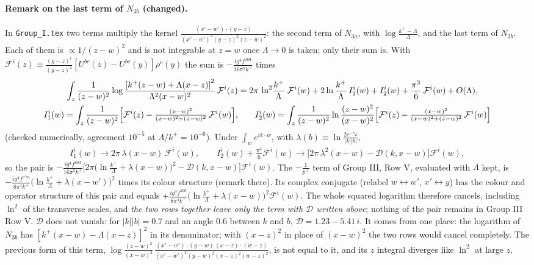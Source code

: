 \documentclass[9pt]{article}
\numberwithin{equation}{section}
\begin{document}
{\color{red}
\paragraph{Remark on the last term of $N_{3b}$ (changed).}
In \texttt{Group\_I.tex} two terms multiply the kernel $\frac{(x'-w')\cdot(y-z)}{(x'-w')^{2}(y-z)^{2}(z-w)^{2}}$: the second term of $N_{3a}$, with $\log\frac{k^{+}-\Lambda}{\Lambda}$, and the last term of $N_{3b}$. Each of them is $\propto 1/(z-w)^{2}$ and is not integrable at $z=w$ once $\Lambda\to0$ is taken; only their sum is. With $\mathcal{F}^{i}(z)\equiv\frac{(y-z)^{i}}{(y-z)^{2}}\left[U^{bc}(z)-U^{bc}(y)\right]\rho^{c}(y)$ the sum is $-\frac{ig^{4}f^{abd}}{16\pi^{5}k^{+}}$ times
\begin{align}
\int_{z}\frac{1}{(z-w)^{2}}\log\frac{\left[k^{+}(z-w)+\Lambda(x-z)\right]^{2}}{\Lambda^{2}(x-w)^{2}}\,\mathcal{F}^{i}(z)
&=2\pi\,\ln^{2}\!\frac{k^{+}}{\Lambda}\;\mathcal{F}^{i}(w)
+2\ln\frac{k^{+}}{\Lambda}\,I_{1}^{i}(w)+I_{2}^{i}(w)+\frac{\pi^{3}}{6}\,\mathcal{F}^{i}(w)+O(\Lambda),\\
I_{1}^{i}(w)=\int_{z}\frac{1}{(z-w)^{2}}\Big[\mathcal{F}^{i}(z)-\tfrac{(x-w)^{2}}{(x-w)^{2}+(z-w)^{2}}\,\mathcal{F}^{i}(w)\Big],&\qquad
I_{2}^{i}(w)=\int_{z}\frac{1}{(z-w)^{2}}\ln\frac{(z-w)^{2}}{(x-w)^{2}}\Big[\mathcal{F}^{i}(z)-\tfrac{(x-w)^{2}}{(x-w)^{2}+(z-w)^{2}}\,\mathcal{F}^{i}(w)\Big]\notag
\end{align}
(checked numerically, agreement $10^{-5}$ at $\Lambda/k^{+}=10^{-6}$). Under $\int_{w}e^{ik\cdot w}$, with $\lambda(b)\equiv\ln\frac{2e^{-\gamma_{E}}}{|k||b|}$,
\begin{align}
I_{1}^{i}(w)\to2\pi\,\lambda(x-w)\,\mathcal{F}^{i}(w),\qquad
I_{2}^{i}(w)+\frac{\pi^{3}}{6}\mathcal{F}^{i}(w)\to\Big[2\pi\,\lambda^{2}(x-w)-\mathcal{D}(k,x-w)\Big]\mathcal{F}^{i}(w),
\end{align}
so the pair is $-\frac{ig^{4}f^{abd}}{16\pi^{5}k^{+}}\Big[2\pi\big(\ln\frac{k^{+}}{\Lambda}+\lambda(x-w)\big)^{2}-\mathcal{D}(k,x-w)\Big]\mathcal{F}^{i}(w)$. The $-\frac{1}{p^{+}}$ term of Group III, Row V, evaluated with $\Lambda$ kept, is $-\frac{ig^{4}f^{c'ca}}{8\pi^{4}k^{+}}\big(\ln\frac{k^{+}}{\Lambda}+\lambda(x-w')\big)^{2}$ times its colour structure (remark there). Its complex conjugate (relabel $w\leftrightarrow w'$, $x'\leftrightarrow y$) has the colour and operator structure of this pair and equals $+\frac{ig^{4}f^{abd}}{8\pi^{4}k^{+}}\big(\ln\frac{k^{+}}{\Lambda}+\lambda(x-w)\big)^{2}\mathcal{F}^{i}(w)$. The whole squared logarithm therefore cancels, including $\ln^{2}$ of the transverse scales, and \emph{the two rows together leave only the term with $\mathcal{D}$ written above}; nothing of the pair remains in Group III Row V. $\mathcal{D}$ does not vanish: for $|k||b|=0.7$ and an angle $0.6$ between $k$ and $b$, $\mathcal{D}=1.23-5.41\,i$. It comes from one place: the logarithm of $N_{3b}$ has $[k^{+}(x-w)-\Lambda(x-z)]^{2}$ in its denominator; with $(x-z)^{2}$ in place of $(x-w)^{2}$ the two rows would cancel completely. The previous form of this term, $\log\frac{(z-w)^{2}}{(x-w)^{2}}\,\frac{(x'-w')\cdot(y-w)\,(x-z)\cdot(w-z)}{(x'-w')^{2}(y-w)^{2}(x-z)^{2}(w-z)^{2}}$, is not equal to it, and its $z$ integral diverges like $\ln^{2}$ at large $z$.
}
\end{document}
